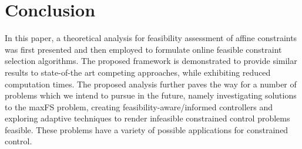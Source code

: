 \documentclass[letterpaper, 10 pt, conference]{ieeeconf}  %
\begin{document}
\section{Conclusion}\label{sec:concl}
In this paper, a theoretical analysis for feasibility assessment of affine constraints was first presented and then employed to formulate online feasible constraint selection algorithms. The proposed framework is demonstrated to provide similar results to state-of-the art competing approaches, while exhibiting reduced computation times. The proposed analysis further paves the way for a number of problems which we intend to pursue in the future, namely investigating solutions to the maxFS problem, creating feasibility-aware/informed controllers and exploring adaptive techniques to render infeasible constrained control problems feasible. These problems have a variety of possible applications for constrained control.   




\end{document}
